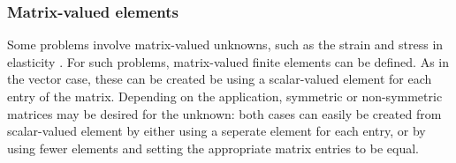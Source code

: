 \documentclass[sn-mathphys-num]{sn-jnl}%
\theoremstyle{thmstyleone}%
\theoremstyle{thmstyletwo}%
\theoremstyle{thmstylethree}%
\begin{document}
\subsubsection{Matrix-valued elements}
Some problems involve matrix-valued unknowns, such as the strain and stress in elasticity \cite{regge-1}.
For such problems, matrix-valued finite elements can be defined.
As in the vector case, these can be created be using a scalar-valued element for each
entry of the matrix. Depending on the application, symmetric or non-symmetric matrices may be
desired for the unknown: both cases can easily be created from scalar-valued element by either
using a seperate element for each entry, or by using fewer elements and setting the appropriate
matrix entries to be equal.
\end{document}
